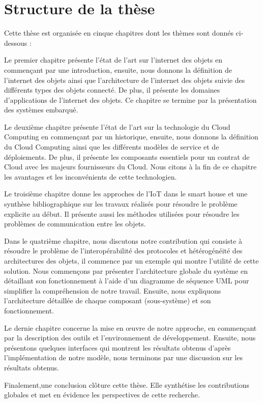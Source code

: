  
\section*{Structure de la thèse}

Cette thèse est organisée en cinque chapitres dont les thèmes sont donnés ci-dessous : 




 Le premier chapitre présente l’état de l’art sur l’internet des objets en commençant par une introduction, ensuite, nous donnons la définition de l’internet des objets ainsi que l’architecture de l’internet des objets suivie des différents types des objets connecté. De plus, il présente les domaines d’applications de l’internet des objets. Ce chapitre se termine par la présentation des systèmes embarqué. 
 
 
Le deuxième chapitre présente l’état de l’art sur la technologie du Cloud Computing en commençant par un historique, ensuite, nous donnons la définition du Cloud Computing ainsi que les différents modèles de service et de déploiements. De plus, il présente les composants essentiels pour un contrat de Cloud avec les majeurs fournisseurs du Cloud. Nous  citons à la fin de ce chapitre les avantages et les inconvénients de cette technologien.


Le troisième chapitre donne les approches de l’IoT dans le smart house et une synthèse bibliographique sur les travaux réalisés pour résoudre le problème explicite au début. Il présente aussi les méthodes utilisées pour résoudre les problèmes de communication entre les objets. 


Dans le quatrième chapitre, nous discutons notre contribution qui consiste à résoudre le problème de l’interopérabilité des protocoles et hétérogénéité des architectures des objets, il commence par un exemple qui montre l’utilité de cette solution. Nous  commençons par présenter l’architecture globale du système en détaillant son fonctionnement à l’aide d’un diagramme de séquence UML pour simplifier la compréhension de notre travail. Ensuite, nous  expliquons  l’architecture détaillée de chaque composant (sous-système) et son fonctionnement.


 Le dernie chapitre concerne la mise en œuvre de notre approche, en commençant par la description des outils et l’environnement de développement. Ensuite, nous  présentons quelques interfaces qui montrent les résultats obtenus d’après l’implémentation de notre modèle, nous terminons par une discussion sur les résultats obtenus. 
 
 
Finalement,une conclusion clôture cette thèse. Elle synthétise les contributions globales et met en évidence les perspectives de cette recherche.

